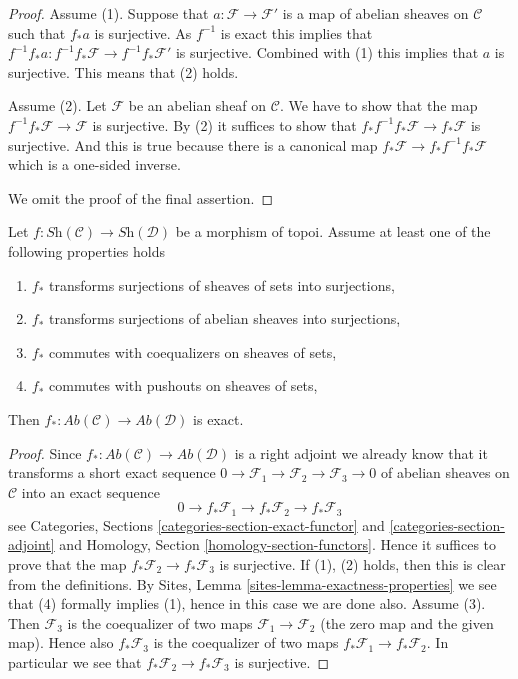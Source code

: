 \begin{proof}
Assume (1). Suppose that $a : \mathcal{F} \to \mathcal{F}'$
is a map of abelian sheaves on $\mathcal{C}$ such that $f_*a$ is surjective.
As $f^{-1}$ is exact this implies that
$f^{-1}f_*a : f^{-1}f_*\mathcal{F} \to f^{-1}f_*\mathcal{F}'$
is surjective. Combined with (1) this implies that $a$ is surjective.
This means that (2) holds.

\medskip\noindent
Assume (2). Let $\mathcal{F}$ be an abelian sheaf on $\mathcal{C}$.
We have to show that the map $f^{-1}f_*\mathcal{F} \to \mathcal{F}$ is
surjective. By (2) it suffices to show that
$f_*f^{-1}f_*\mathcal{F} \to f_*\mathcal{F}$ is surjective.
And this is true because there is a canonical map
$f_*\mathcal{F} \to f_*f^{-1}f_*\mathcal{F}$ which is a one-sided inverse.

\medskip\noindent
We omit the proof of the final assertion.
\end{proof}

\begin{lemma}
\label{lemma-exactness}
Let $f : \textit{Sh}(\mathcal{C}) \to \textit{Sh}(\mathcal{D})$ be
a morphism of topoi. Assume at least one of the following properties
holds
\begin{enumerate}
\item $f_*$ transforms surjections of sheaves of sets into surjections,
\item $f_*$ transforms surjections of abelian sheaves into surjections,
\item $f_*$ commutes with coequalizers on sheaves of sets,
\item $f_*$ commutes with pushouts on sheaves of sets,
\end{enumerate}
Then $f_* : \textit{Ab}(\mathcal{C}) \to \textit{Ab}(\mathcal{D})$
is exact.
\end{lemma}

\begin{proof}
Since $f_* : \textit{Ab}(\mathcal{C}) \to \textit{Ab}(\mathcal{D})$
is a right adjoint we already know that it transforms a short exact sequence
$0 \to \mathcal{F}_1 \to \mathcal{F}_2 \to \mathcal{F}_3 \to 0$
of abelian sheaves on $\mathcal{C}$ into an exact sequence
$$
0 \to f_*\mathcal{F}_1 \to f_*\mathcal{F}_2 \to f_*\mathcal{F}_3
$$
see
Categories, Sections \ref{categories-section-exact-functor} and
\ref{categories-section-adjoint}
and
Homology, Section \ref{homology-section-functors}. Hence it suffices to
prove that the map $f_*\mathcal{F}_2 \to f_*\mathcal{F}_3$ is surjective.
If (1), (2) holds, then this is clear from the definitions. By
Sites, Lemma \ref{sites-lemma-exactness-properties}
we see that (4) formally implies (1), hence in this case we are done also.
Assume (3). Then $\mathcal{F}_3$ is the coequalizer of two maps
$\mathcal{F}_1 \to \mathcal{F}_2$ (the zero map and the given map).
Hence also $f_*\mathcal{F}_3$ is the coequalizer of two maps
$f_*\mathcal{F}_1 \to f_*\mathcal{F}_2$. In particular we see that
$f_*\mathcal{F}_2 \to f_*\mathcal{F}_3$ is surjective.
\end{proof}

